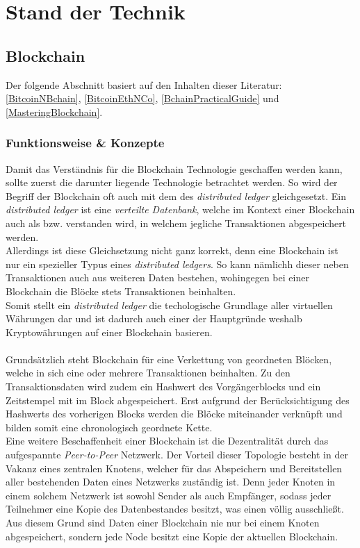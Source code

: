 \chapter{Stand der Technik}
\label{kap:Kapitel02}
%
       
%
\section{Blockchain}
Der folgende Abschnitt basiert auf den Inhalten dieser Literatur: \ref{BitcoinNBchain}, \ref{BitcoinEthNCo}, \ref{BchainPracticalGuide} und \ref{MasteringBlockchain}. 

\subsection{Funktionsweise \& Konzepte}
Damit das Verständnis für die Blockchain Technologie geschaffen werden kann, sollte zuerst die darunter liegende Technologie betrachtet werden. 
So wird der Begriff der Blockchain oft auch mit dem des \textit{distributed ledger} gleichgesetzt. Ein \textit{distributed ledger} ist eine \textit{verteilte Datenbank}, welche im Kontext einer Blockchain auch als  bzw.  \cite{DL:bafin} verstanden wird, in welchem jegliche Transaktionen abgespeichert werden.\\
Allerdings ist diese Gleichsetzung nicht ganz korrekt, denn eine Blockchain ist nur ein spezieller Typus eines \textit{distributed ledgers}. So kann nämlichh dieser neben Transaktionen auch aus weiteren Daten bestehen, wohingegen bei einer Blockchain die Blöcke stets Transaktionen beinhalten. \\
Somit stellt ein \textit{distributed ledger} die techologische Grundlage aller virtuellen Währungen dar und ist dadurch auch einer der Hauptgründe weshalb Kryptowährungen auf einer Blockchain basieren.\\\\
Grundsätzlich steht Blockchain für eine Verkettung von geordneten Blöcken, welche in sich eine oder mehrere Transaktionen beinhalten. 
Zu den Transaktionsdaten wird zudem ein Hashwert des Vorgängerblocks und ein Zeitstempel mit im Block abgespeichert. Erst aufgrund der Berücksichtigung des Hashwerts des vorherigen Blocks werden die Blöcke miteinander verknüpft und bilden somit eine chronologisch geordnete Kette.\\
Eine weitere Beschaffenheit einer Blockchain ist die Dezentralität durch das aufgespannte \textit{Peer-to-Peer} Netzwerk. Der Vorteil dieser Topologie besteht in der Vakanz eines zentralen Knotens, welcher für das Abspeichern und Bereitstellen aller bestehenden Daten eines Netzwerks zuständig ist. Denn jeder Knoten in einem solchem Netzwerk ist sowohl Sender als auch Empfänger, sodass jeder Teilnehmer eine Kopie des Datenbestandes besitzt, was einen  völlig ausschließt. Aus diesem Grund sind Daten einer Blockchain nie nur bei einem Knoten abgespeichert, sondern jede Node besitzt eine Kopie der aktuellen Blockchain.\\
